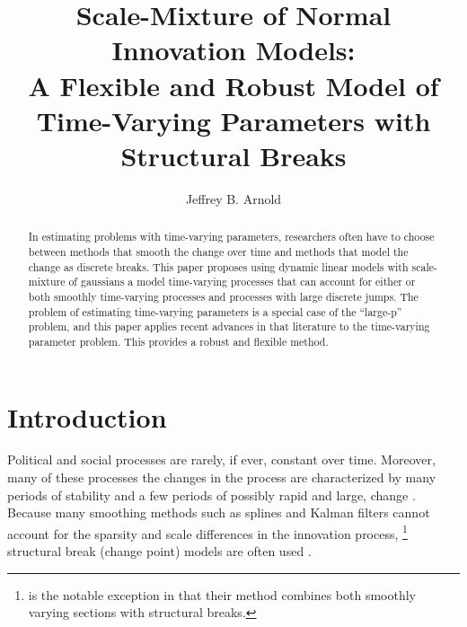 \documentclass{article}
\author{Jeffrey B. Arnold}
\title{Scale-Mixture of Normal Innovation Models: \\
  A Flexible and Robust Model of Time-Varying Parameters with Structural Breaks}
\begin{document}
\maketitle{}

\begin{abstract}
  In estimating problems with time-varying parameters, researchers often have to choose between methods that smooth the change over time and methods that model the change as discrete breaks.
  This paper proposes using dynamic linear models with scale-mixture of gaussians a model time-varying processes that can account for either or both smoothly time-varying processes and processes with large discrete jumps.
  The problem of estimating time-varying parameters is a special case of the ``large-p'' problem, and this paper applies recent advances in that literature to the time-varying parameter problem.
  This provides a robust and flexible method. 
\end{abstract}

\section{Introduction}
\label{sec:introduction}

Political and social processes are rarely, if ever, constant over time. 
Moreover, many of these processes the changes in the process are characterized by many periods of stability and a few periods of possibly rapid and large, change \parencite{RatkovicEng2010}.
Because many smoothing methods such as splines and Kalman filters cannot account for the sparsity and scale differences in the innovation process,
\footnote{\textcite{RatkovicEng2010} is the notable exception in that their method combines both smoothly varying sections with structural breaks.}
structural break (change point) models are often used \parencites{CalderiaZorn1998}{Spirling2007}{Spirling2007a}{Park2010}{Park2011}.%
\end{document}
